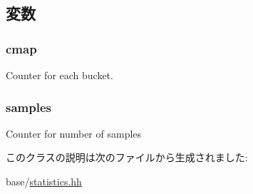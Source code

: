 \subsection{変数}
\hypertarget{classStats_1_1SparseHistStor_afc3dc68e80fbd8901da278bff71674e4}{
\subsubsection[{cmap}]{ {\bf cmap}}}
\label{classStats_1_1SparseHistStor_afc3dc68e80fbd8901da278bff71674e4}
Counter for each bucket. \hypertarget{classStats_1_1SparseHistStor_ab4db99aba3dd28686061dd3d5475b3bd}{
\subsubsection[{samples}]{ {\bf samples}}}
\label{classStats_1_1SparseHistStor_ab4db99aba3dd28686061dd3d5475b3bd}
Counter for number of samples 

このクラスの説明は次のファイルから生成されました:\begin{DoxyCompactItemize}
\item 
base/\hyperlink{statistics_8hh}{statistics.hh}\end{DoxyCompactItemize}
